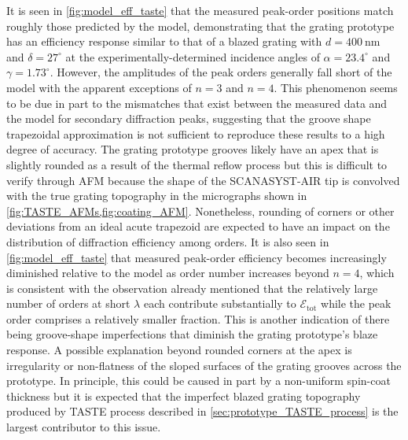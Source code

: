 It is seen in \cref{fig:model_eff_taste} that the measured peak-order positions match roughly those predicted by the model, demonstrating that the grating prototype has an efficiency response similar to that of a blazed grating with $d=\SI{400}{\nm}$~ and $\delta = 27^{\circ}$ at the experimentally-determined incidence angles of $\alpha = 23.4^{\circ}$ and $\gamma = 1.73^{\circ}$. 
However, the amplitudes of the peak orders generally fall short of the model with the apparent exceptions of $n=3$ and $n=4$. 
This phenomenon seems to be due in part to the mismatches that exist between the measured data and the model for secondary diffraction peaks, suggesting that the groove shape trapezoidal approximation is not sufficient to reproduce these results to a high degree of accuracy. 
The grating prototype grooves likely have an apex that is slightly rounded as a result of the thermal reflow process but this is difficult to verify through AFM because the shape of the \textsc{SCANASYST-AIR} tip is convolved with the true grating topography in the micrographs shown in \cref{fig:TASTE_AFMs,fig:coating_AFM}. 
Nonetheless, rounding of corners or other deviations from an ideal acute trapezoid are expected to have an impact on the distribution of diffraction efficiency among orders. 
It is also seen in \cref{fig:model_eff_taste} that measured peak-order efficiency becomes increasingly diminished relative to the model as order number increases beyond $n=4$, which is consistent with the observation already mentioned that the relatively large number of orders at short $\lambda$ each contribute substantially to $\mathscr{E}_{\text{tot}}$ while the peak order comprises a relatively smaller fraction. 
This is another indication of there being groove-shape imperfections that diminish the grating prototype's blaze response. 
A possible explanation beyond rounded corners at the apex is irregularity or non-flatness of the sloped surfaces of the grating grooves across the prototype. 
In principle, this could be caused in part by a non-uniform spin-coat thickness but it is expected that the imperfect blazed grating topography produced by TASTE process described in \cref{sec:prototype_TASTE_process} is the largest contributor to this issue.  

